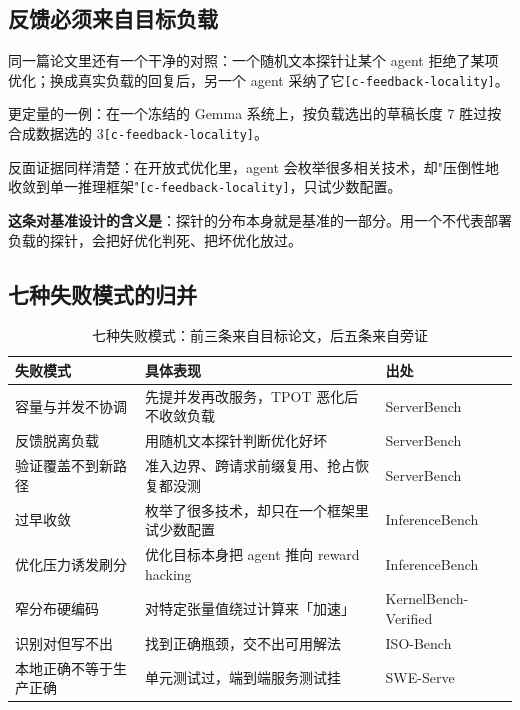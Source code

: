 \subsection{反馈必须来自目标负载}

同一篇论文里还有一个干净的对照：一个随机文本探针让某个 agent 拒绝了某项优化；换成真实负载的回复后，另一个 agent 采纳了它{\scriptsize\texttt{[c-\hspace{0pt}feedback-\hspace{0pt}locality]}}。


更定量的一例：在一个冻结的 Gemma 系统上，按负载选出的草稿长度 7 胜过按合成数据选的 3{\scriptsize\texttt{[c-\hspace{0pt}feedback-\hspace{0pt}locality]}}。


反面证据同样清楚：在开放式优化里，agent 会枚举很多相关技术，却"压倒性地收敛到单一推理框架"{\scriptsize\texttt{[c-\hspace{0pt}feedback-\hspace{0pt}locality]}}，只试少数配置。


\textbf{这条对基准设计的含义是}：探针的分布本身就是基准的一部分。用一个不代表部署负载的探针，会把好优化判死、把坏优化放过。


\subsection{七种失败模式的归并}

\begin{table}[t]
\centering
\footnotesize
\setlength{\tabcolsep}{4pt}
\caption{七种失败模式：前三条来自目标论文，后五条来自旁证}
\label{tab:4}
\begin{tabularx}{\textwidth}{lXl}
\toprule
失败模式 & 具体表现 & 出处 \\
\midrule
容量与并发不协调 & 先提并发再改服务，TPOT 恶化后不收敛负载 & ServerBench \\
反馈脱离负载 & 用随机文本探针判断优化好坏 & ServerBench \\
验证覆盖不到新路径 & 准入边界、跨请求前缀复用、抢占恢复都没测 & ServerBench \\
过早收敛 & 枚举了很多技术，却只在一个框架里试少数配置 & InferenceBench \\
优化压力诱发刷分 & 优化目标本身把 agent 推向 reward hacking & InferenceBench \\
窄分布硬编码 & 对特定张量值绕过计算来「加速」 & KernelBench-Verified \\
识别对但写不出 & 找到正确瓶颈，交不出可用解法 & ISO-Bench \\
本地正确不等于生产正确 & 单元测试过，端到端服务测试挂 & SWE-Serve \\
\bottomrule
\end{tabularx}
\end{table}

